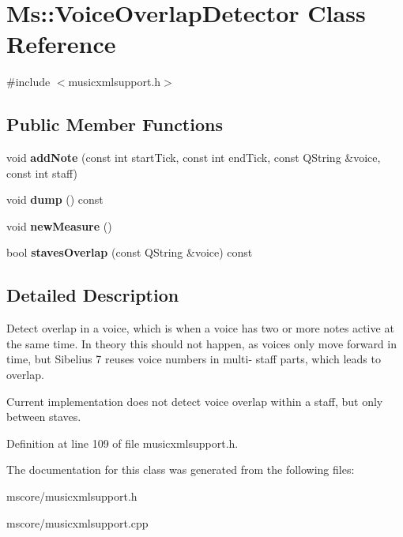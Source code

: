 \hypertarget{class_ms_1_1_voice_overlap_detector}{}\section{Ms\+:\+:Voice\+Overlap\+Detector Class Reference}
\label{class_ms_1_1_voice_overlap_detector}


{\ttfamily \#include $<$musicxmlsupport.\+h$>$}

\subsection*{Public Member Functions}
\begin{DoxyCompactItemize}
\item 
\mbox{\label{class_ms_1_1_voice_overlap_detector_a5ae0da70122cb1cf079e5f63f8c95392}} 
void {\bfseries add\+Note} (const int start\+Tick, const int end\+Tick, const Q\+String \&voice, const int staff)
\item 
\mbox{\label{class_ms_1_1_voice_overlap_detector_aa4874f3dbd2e8686474d5129b5ae96d1}} 
void {\bfseries dump} () const
\item 
\mbox{\label{class_ms_1_1_voice_overlap_detector_a1b990818138615d53a4129fb0b405f0d}} 
void {\bfseries new\+Measure} ()
\item 
\mbox{\label{class_ms_1_1_voice_overlap_detector_ac377135334ec99eef334c2194053a7b0}} 
bool {\bfseries staves\+Overlap} (const Q\+String \&voice) const
\end{DoxyCompactItemize}


\subsection{Detailed Description}
Detect overlap in a voice, which is when a voice has two or more notes active at the same time. In theory this should not happen, as voices only move forward in time, but Sibelius 7 reuses voice numbers in multi-\/ staff parts, which leads to overlap.

Current implementation does not detect voice overlap within a staff, but only between staves. 

Definition at line 109 of file musicxmlsupport.\+h.



The documentation for this class was generated from the following files\+:\begin{DoxyCompactItemize}
\item 
mscore/musicxmlsupport.\+h\item 
mscore/musicxmlsupport.\+cpp\end{DoxyCompactItemize}
